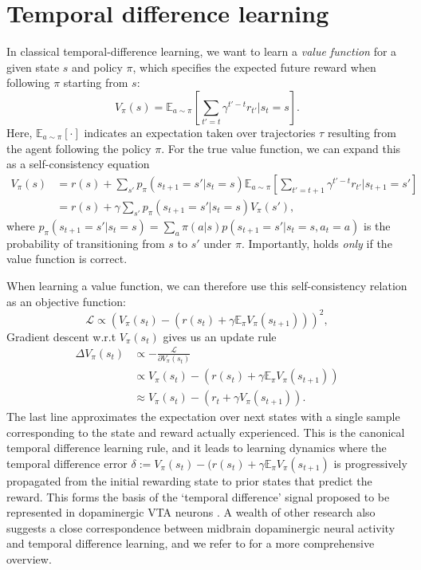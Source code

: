 \section{Temporal difference learning}
\label{sec:temporal_difference}

In classical temporal-difference learning, we want to learn a \emph{value function} for a given state $s$ and policy $\pi$, which specifies the expected future reward when following $\pi$ starting from $s$:
\begin{equation}
    \label{eq:V-values}
    V_{\pi}(s) = \mathbb{E}_{a \sim \pi} \left [ \sum_{t' = t} \gamma^{t' - t} r_{t'} | s_t = s \right ].
\end{equation}
Here, $\mathbb{E}_{a \sim \pi} [ \cdot ]$ indicates an expectation taken over trajectories $\tau$ resulting from the agent following the policy $\pi$.
For the true value function, we can expand this as a self-consistency equation
\begin{align}
    \label{eq:value_expansion}
    V_{\pi}(s) &= r(s) + \sum_{s'} p_{\pi}(s_{t+1} = s' | s_t = s) \mathbb{E}_{a \sim \pi} \left [ \sum_{t' = t+1} \gamma^{t' - t} r_{t'} | s_{t+1} = s' \right ] \\
    &=  r(s) + \gamma \sum_{s'} p_{\pi}(s_{t+1} = s' | s_t = s) V_{\pi}(s'),
\end{align}
where $p_{\pi}(s_{t+1} = s' | s_t = s) = \sum_a \pi(a|s) p(s_{t+1} = s' | s_t = s, a_t = a)$ is the probability of transitioning from $s$ to $s'$ under $\pi$.
Importantly,  holds \emph{only} if the value function is correct.

When learning a value function, we can therefore use this self-consistency relation as an objective function:
\begin{equation}
    \mathcal{L} \propto \left (  V_\pi(s_t) - (r(s_t) + \gamma \mathbb{E}_\pi V_{\pi}(s_{t+1})) \right )^2,
\end{equation}
Gradient descent w.r.t $V_\pi(s_t)$ gives us an update rule
\begin{align}
    \label{eq:TD-learning}
    \Delta V_\pi(s_t) &\propto - \frac{\mathcal{L}}{\partial V_\pi(s_t)}\\
    &\propto V_\pi(s_t) - (r(s_t) + \gamma \mathbb{E}_\pi V_{\pi}(s_{t+1}))\\
    &\approx V_\pi(s_t) - (r_t + \gamma V_{\pi}(s_{t+1})).
\end{align}
The last line approximates the expectation over next states with a single sample corresponding to the state and reward actually experienced.
This is the canonical temporal difference learning rule, and it leads to learning dynamics where the temporal difference error $\delta := V_\pi(s_t) - (r(s_t) + \gamma \mathbb{E}_\pi V_{\pi}(s_{t+1})$ is progressively propagated from the initial rewarding state to prior states that predict the reward.
This forms the basis of the `temporal difference' signal proposed to be represented in dopaminergic VTA neurons \citep{schultz1997neural}.
A wealth of other research also suggests a close correspondence between midbrain dopaminergic neural activity and temporal difference learning, and we refer to \citet{niv2009reinforcement} for a more comprehensive overview.

